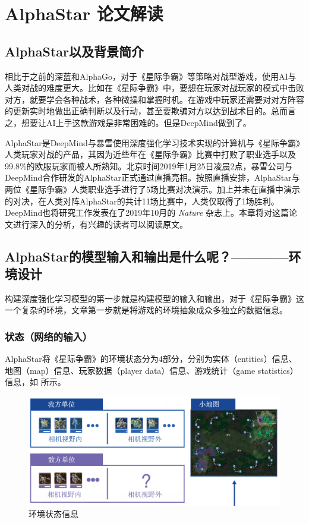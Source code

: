 \section{AlphaStar 论文解读}

\subsection{AlphaStar以及背景简介} 

相比于之前的深蓝和AlphaGo，对于《星际争霸\uppercase\expandafter{}》等策略对战型游戏，使用AI与人类对战的难度更大。比如在《星际争霸\uppercase\expandafter{}》中，要想在玩家对战玩家的模式中击败对方，就要学会各种战术，各种微操和掌握时机。在游戏中玩家还需要对对方阵容的更新实时地做出正确判断以及行动，甚至要欺骗对方以达到战术目的。总而言之，想要让AI上手这款游戏是非常困难的。但是DeepMind做到了。

AlphaStar是DeepMind与暴雪使用深度强化学习技术实现的计算机与《星际争霸\uppercase\expandafter{}》人类玩家对战的产品，其因为近些年在《星际争霸\uppercase\expandafter{}》比赛中打败了职业选手以及99.8\%的欧服玩家而被人所熟知。北京时间2019年1月25日凌晨2点，暴雪公司与DeepMind合作研发的AlphaStar正式通过直播亮相。按照直播安排，AlphaStar与两位《星际争霸\uppercase\expandafter{}》人类职业选手进行了5场比赛对决演示。加上并未在直播中演示的对决，在人类对阵AlphaStar的共计11场比赛中，人类仅取得了1场胜利。DeepMind也将研究工作发表在了2019年10月的 \emph{Nature} 杂志上。本章将对这篇论文进行深入的分析，有兴趣的读者可以阅读原文。

\subsection{AlphaStar的模型输入和输出是什么呢？————环境设计} 

构建深度强化学习模型的第一步就是构建模型的输入和输出，对于《星际争霸\uppercase\expandafter{}》这一个复杂的环境，文章第一步就是将游戏的环境抽象成众多独立的数据信息。

\subsubsection{状态（网络的输入）} 

AlphaStar将《星际争霸\uppercase\expandafter{}》的环境状态分为4部分，分别为实体（entities）信息、地图（map）信息、玩家数据（player data）信息、游戏统计（game statistics）信息，如 所示。

\begin{figure}[htb]
    \centering
    \includegraphics[width=0.7\linewidth]{res/ch13/13.1}
    \caption{环境状态信息}
    \label{fig:13_1}
\end{figure}

